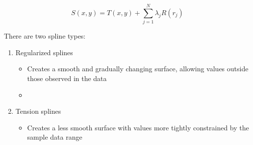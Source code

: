 \documentclass{article}
\begin{document}
\[S(x, y) = T(x, y) + \sum_{j=1}^{N} \lambda_{j} R(r_{j})\]

There are two spline types:

\begin{enumerate}
    \item Regularized splines
    \begin{itemize}
        \item Creates a smooth and gradually changing surface, allowing values outside those observed in the data
        \item 
    \end{itemize}
    \item Tension splines
    \begin{itemize}
        \item Creates a less smooth surface with values more tightly constrained by the sample data range
    \end{itemize}
\end{enumerate}
\end{document}
